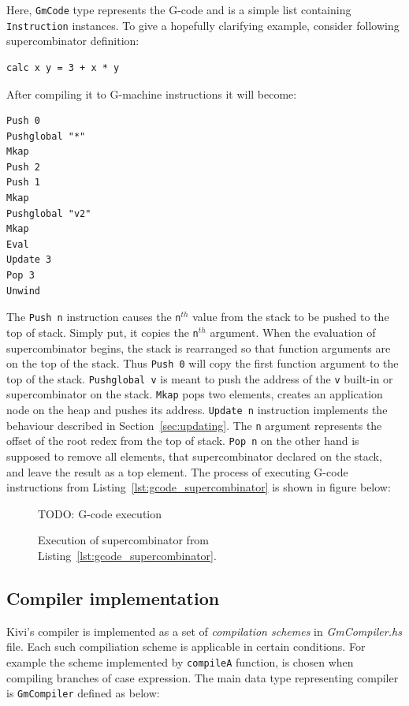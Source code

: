 \documentclass[12pt,a4paper]{report}
\begin{document}
Here, \texttt{GmCode} type represents the G-code and is a simple list containing
\texttt{Instruction} instances. To give a hopefully clarifying example,
consider following supercombinator definition:

\vspace*{0.2in}
\begin{lstlisting}[style=haskell,label=lst:sc_to_compile,caption=Supercombinator to compile.]
calc x y = 3 + x * y
\end{lstlisting}

After compiling it to G-machine instructions it will become:

\vspace*{0.2in}
\begin{lstlisting}[style=haskell,label=lst:gcode_supercombinator,caption={Compiled
  supercombinator body.}]
Push 0
Pushglobal "*"
Mkap
Push 2
Push 1
Mkap
Pushglobal "v2"
Mkap
Eval
Update 3
Pop 3
Unwind
\end{lstlisting}

The \texttt{Push n} instruction causes the \texttt{n}$^{th}$ value from the
stack to be pushed to the top of stack. Simply put, it copies the
\texttt{n}$^{th}$ argument. When the evaluation of supercombinator begins, the
stack is rearranged so that function arguments are on the top of the stack.
Thus \texttt{Push 0} will copy the first function argument to the top of the
stack. \texttt{Pushglobal v} is meant to push the address of the \texttt{v}
built-in or supercombinator on the stack. \texttt{Mkap} pops two elements,
creates an application node on the heap and pushes its address. \texttt{Update
n} instruction implements the behaviour described in
Section~\ref{sec:updating}. The \texttt{n} argument represents the offset of
the root redex from the top of stack. \texttt{Pop n} on the other hand is
supposed to remove all elements, that supercombinator declared on the stack,
and leave the result as a top element. The process of executing G-code
instructions from Listing~\ref{lst:gcode_supercombinator} is shown in figure
below:

\begin{figure}[h!]
  \centering

  TODO: G-code execution

  \caption{Execution of supercombinator from Listing~\ref{lst:gcode_supercombinator}.}
  \label{fig:gcode_execution}
\end{figure}

\subsection{Compiler implementation}
Kivi's compiler is implemented as a set of \textit{compilation schemes} in
\textit{GmCompiler.hs} file. Each such compiliation scheme is applicable in
certain conditions. For example the scheme implemented by \texttt{compileA}
function, is chosen when compiling branches of case expression. The main data
type representing compiler is \texttt{GmCompiler} defined as below:
\end{document}
